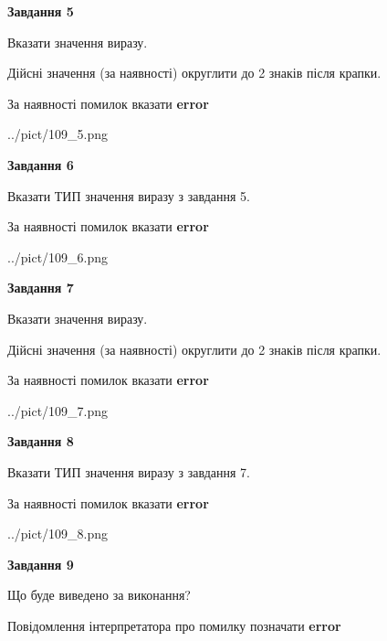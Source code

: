 \documentclass[11pt, ukrainian]{article}
\begin{document}
{\begin {large}
{\begin {center}\textbf{Завдання 5}\end {center}}\par
Вказати значення виразу. \par
Дійсні значення (за наявності) округлити до 2 знаків після крапки. \par
За наявності помилок вказати \textbf{error}

\begin{center}
	{../pict/109_5.png}
\end{center}
\newpage

{\begin {center}\textbf{Завдання 6}\end {center}}\par
Вказати ТИП значення виразу з завдання 5. \par
За наявності помилок вказати \textbf{error}

\begin{center}
	{../pict/109_6.png}
\end{center}
\newpage

{\begin {center}\textbf{Завдання 7}\end {center}}\par
Вказати значення виразу. \par
Дійсні значення (за наявності) округлити до 2 знаків після крапки. \par
За наявності помилок вказати \textbf{error}

\begin{center}
	{../pict/109_7.png}
\end{center}
\newpage

{\begin {center}\textbf{Завдання 8}\end {center}}\par
Вказати ТИП значення виразу з завдання 7. \par
За наявності помилок вказати \textbf{error}

\begin{center}
	{../pict/109_8.png}
\end{center}
\newpage

{\begin {center}\textbf{Завдання 9}\end {center}}\par
Що буде виведено за виконання? \par
Повідомлення інтерпретатора про помилку позначати \textbf{error}


\end{large}}
\end{document}
